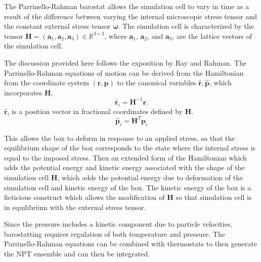 The Parrinello-Rahman barostat\cite{parrinello1980_barostat,parrinello1981_barostat} allows the simulation cell to vary in time as a result of the difference between varying the internal microscopic stress tensor and the constant external stress tensor $\bm{\omega}$.  The simulation cell is characterized by the tensor $\bm{H}=(\bm{a}_1,\bm{a}_2,\bm{a}_3) \in \mathbb{R}^{3 \times 3}$, where $\bm{a}_1$, $\bm{a}_2$, and $\bm{a}_3$, are the lattice vectors of the simulation cell.

The discussion provided here follows the exposition by Ray and Rahman\cite{ray1984_npt}.  The Parrinello-Rahman equations of motion can be derived from the Hamiltonian from the coordinate system $(\bm{r},\bm{p})$ to the canonical variables $\hat{\bm{r}},\hat{\bm{p}}$, which incorporates $\bm{H}$,
\begin{equation}
  \hat{\bm{r}}_i = \bm{H}^{-1} \bm{r}.
\end{equation}
$\hat{\bm{r}}_i$ is a position vector in fractional coordinates defined by $\bm{H}$.
\begin{equation}
  \hat{\bm{p}}_i = \bm{H}^T \bm{p}_i
\end{equation}

This allows the box to deform in response to an applied stress, so that the equilibrium shape of the box corresponds to the state where the internal stress is equal to the imposed stress.  Then an extended form of the Hamiltonian which adds the potential energy and kinetic energy associated with the shape of the simulation cell $\bm{H}$, which adds the potential energy due to deformation of the simulation cell and kinetic energy of the box.  The kinetic energy of the box is a ficticious construct which allows the modification of $\bm{H}$ so that simulation cell is in equilibrium with the external stress tensor.

Since the pressure includes a kinetic component due to particle velocities, barostatting requires regulation of both temperature and pressure.
The Parrinello-Rahman equations can be combined with thermostats to then generate the NPT ensemble\cite{shinoda2004_nosehoover} and can then be integrated\cite{tuckerman2006_timeintegrator}.


